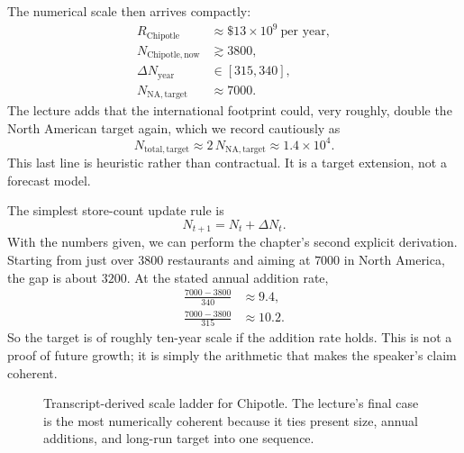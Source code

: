 The numerical scale then arrives compactly:
\begin{align}
R_{\mathrm{Chipotle}} &\approx \$13\times 10^9 \ \text{per year}, \\
N_{\mathrm{Chipotle,now}} &\gtrsim 3800, \\
\Delta N_{\mathrm{year}} &\in [315,340], \\
N_{\mathrm{NA,target}} &\approx 7000.
\end{align}
The lecture adds that the international footprint could, very roughly, double the North American target again, which we record cautiously as
\begin{equation}
N_{\mathrm{total,target}} \approx 2\,N_{\mathrm{NA,target}} \approx 1.4\times 10^4.
\end{equation}
This last line is heuristic rather than contractual. It is a target extension, not a forecast model.

The simplest store-count update rule is
\begin{equation}
N_{t+1}=N_t+\Delta N_t.
\end{equation}
With the numbers given, we can perform the chapter's second explicit derivation. Starting from just over \(3800\) restaurants and aiming at \(7000\) in North America, the gap is about \(3200\). At the stated annual addition rate,
\begin{align}
\frac{7000-3800}{340} &\approx 9.4, \\
\frac{7000-3800}{315} &\approx 10.2.
\end{align}
So the target is of roughly ten-year scale if the addition rate holds. This is not a proof of future growth; it is simply the arithmetic that makes the speaker's claim coherent.

\begin{figure}
\centering
{}
\caption{Transcript-derived scale ladder for Chipotle. The lecture's final case is the most numerically coherent because it ties present size, annual additions, and long-run target into one sequence.}
\end{figure}

